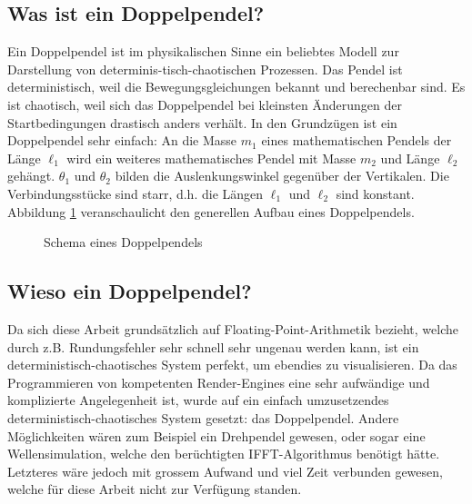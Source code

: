 \documentclass[titlepage, 11pt, a4paper, ngerman]{article}
\begin{document}
\subsection{Was ist ein Doppelpendel?}
Ein Doppelpendel ist im physikalischen Sinne ein beliebtes Modell zur Darstellung von determinis-tisch-chaotischen Prozessen. Das Pendel ist deterministisch, weil die Bewegungsgleichungen bekannt und berechenbar sind. Es ist chaotisch, weil sich das Doppelpendel bei kleinsten Änderungen der Startbedingungen drastisch anders verhält. In den Grundzügen ist ein Doppelpendel sehr einfach: An die Masse $m_{1}$ eines mathematischen Pendels der Länge $\ell_{1}$ wird ein weiteres mathematisches Pendel mit Masse $m_{2}$ und Länge $\ell_{2}$ gehängt. $\theta_{1}$ und $\theta_{2}$ bilden die Auslenkungswinkel gegenüber der Vertikalen. Die Verbindungsstücke sind starr, d.h. die Längen $\ell_{1}$ und $\ell_{2}$ sind konstant. Abbildung \ref{fig:dp-graphic} veranschaulicht den generellen Aufbau eines Doppelpendels.
\begin{figure}[ht]
    \centering
    \caption[Schema eines Doppelpendels]{Schema eines Doppelpendels}
    \label{fig:dp-graphic}
\end{figure}

\subsection{Wieso ein Doppelpendel?}
Da sich diese Arbeit grundsätzlich auf \gls{Floating-Point}-Arithmetik bezieht, welche durch z.B. Rundungsfehler sehr schnell sehr ungenau werden kann, ist ein deterministisch-chaotisches System perfekt, um ebendies zu visualisieren. Da das Programmieren von kompetenten Render-\glspl{Engine} eine sehr aufwändige und komplizierte Angelegenheit ist, wurde auf ein einfach umzusetzendes deterministisch-chaotisches System gesetzt: das Doppelpendel. Andere Möglichkeiten wären zum Beispiel ein Drehpendel gewesen, oder sogar eine Wellensimulation, welche den berüchtigten \acrfull{IFFT}-Algorithmus benötigt hätte. Letzteres wäre jedoch mit grossem Aufwand und viel Zeit verbunden gewesen, welche für diese Arbeit nicht zur Verfügung standen.
\end{document}
